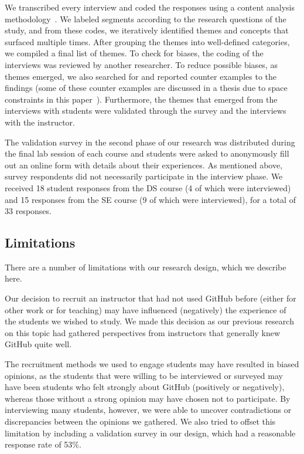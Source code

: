 We transcribed every interview and coded the responses using a content analysis methodology~\cite{charmaz2006constructing}.
We labeled segments according to the research questions of the study, and from these codes, we iteratively identified themes and concepts that surfaced multiple times. After grouping the themes into well-defined categories, we compiled a final list of themes. To check for biases, the coding of the interviews was reviewed by another researcher. To reduce possible biases, as themes emerged, we also searched for and reported counter examples to the findings (some of these counter examples are discussed in a thesis due to space constraints in this paper~\cite{feliciano2015towards}). Furthermore, the themes that emerged from the interviews with students were validated through the survey and the interviews with the instructor.

The validation survey in the second phase of our research was distributed during the final lab session of each course and students were asked to anonymously fill out an online form with details about their experiences. As mentioned above, survey respondents did not necessarily participate in the interview phase. We received 18 student responses from the DS course (4 of which were interviewed) and 15 responses from the SE course (9 of which were interviewed), for a total of 33 responses.

\subsection{Limitations}
There are a number of limitations with our research design, which we describe here.

Our decision to recruit an instructor that had not used GitHub before (either for other work or for teaching) may have influenced (negatively) the experience of the students we wished to study. We made this decision as our previous research on this topic had gathered perspectives from instructors that generally knew GitHub quite well.

The recruitment methods we used to engage students may have resulted in biased opinions, as the students that were willing to be interviewed or surveyed may have been students who felt strongly about GitHub (positively or negatively), whereas those without a strong opinion may have chosen not to participate. By interviewing many students, however, we were able to uncover contradictions or discrepancies between the opinions we gathered. We also tried to offset this limitation by including a validation survey in our design, which had a reasonable response rate of 53\%.

